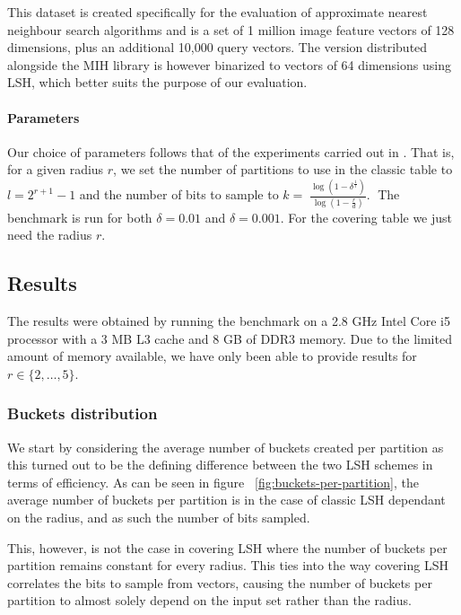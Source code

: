 This dataset is created specifically for the evaluation of approximate nearest neighbour search algorithms and is a set of 1 million image feature vectors of 128 dimensions, plus an additional 10,000 query vectors. The version distributed alongside the MIH library is however binarized to vectors of 64 dimensions using LSH, which better suits the purpose of our evaluation.

\paragraph{Parameters} Our choice of parameters follows that of the experiments carried out in \cite{DBLP:journals/corr/PhamP16}. That is, for a given radius $r$, we set the number of partitions to use in the classic table to $l = 2^{r + 1} - 1$ and the number of bits to sample to $k = 􏰢\frac{\log(1 - \delta^{\frac{1}{l}})}{\log(1 - \frac{r}{d})}$.􏰣 The benchmark is run for both $\delta = 0.01$ and $\delta = 0.001$. For the covering table we just need the radius $r$.

\subsection{Results}

The results were obtained by running the benchmark on a 2.8 GHz Intel Core i5 processor with a 3 MB L3 cache and 8 GB of DDR3 memory. Due to the limited amount of memory available, we have only been able to provide results for $r \in \{2,\ldots,5\}$.

\subsubsection{Buckets distribution}

We start by considering the average number of buckets created per partition as this turned out to be the defining difference between the two LSH schemes in terms of efficiency. As can be seen in figure ~\ref{fig:buckets-per-partition}, the average number of buckets per partition is in the case of classic LSH dependant on the radius, and as such the number of bits sampled.

This, however, is not the case in covering LSH where the number of buckets per partition remains constant for every radius. This ties into the way covering LSH correlates the bits to sample from vectors, causing the number of buckets per partition to almost solely depend on the input set rather than the radius.

